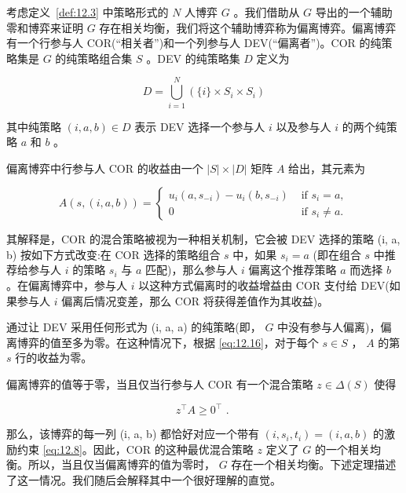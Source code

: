 考虑定义~\ref{def:12.3} 中策略形式的 \(N\) 人博弈 \(G\) 。我们借助从 \(G\) 导出的一个辅助零和博弈来证明 \(G\) 存在相关均衡，我们将这个辅助博弈称为偏离博弈。偏离博弈有一个行参与人 COR(“相关者”)和一个列参与人 DEV(“偏离者”)。COR 的纯策略集是 \(G\) 的纯策略组合集 \(S\) 。DEV 的纯策略集 \(D\) 定义为

\begin{equation}
D = \mathop{\bigcup }\limits_{{i = 1}}^{N}\left( {\{ i\}  \times  {S}_{i} \times  {S}_{i}}\right)  \label{eq:12.15}
\end{equation}

其中纯策略 \(\left( {i,a,b}\right)  \in  D\) 表示 DEV 选择一个参与人 \(i\) 以及参与人 \(i\) 的两个纯策略 \(a\) 和 \(b\) 。

偏离博弈中行参与人 COR 的收益由一个 \(\left| S\right|  \times  \left| D\right|\) 矩阵 \(A\) 给出，其元素为

\begin{equation}
A\left( {s,\left( {i,a,b}\right) }\right)  = \left\{  \begin{array}{ll} {u}_{i}\left( {a,{s}_{-i}}\right)  - {u}_{i}\left( {b,{s}_{-i}}\right) & \text{ if }{s}_{i} = a, \\  0 & \text{ if }{s}_{i} \neq  a. \end{array}\right.  \label{eq:12.16}
\end{equation}

其解释是，COR 的混合策略被视为一种相关机制，它会被 DEV 选择的策略 (i, a, b) 按如下方式改变:在 \(\mathrm{{COR}}\) 选择的策略组合 \(s\) 中，如果 \({s}_{i} = a\) (即在组合 \(s\) 中推荐给参与人 \(i\) 的策略 \({s}_{i}\) 与 \(a\) 匹配)，那么参与人 \(i\) 偏离这个推荐策略 \(a\) 而选择 \(b\) 。在偏离博弈中，参与人 \(i\) 以这种方式偏离时的收益增益由 COR 支付给 DEV(如果参与人 \(i\) 偏离后情况变差，那么 COR 将获得差值作为其收益)。

通过让 DEV 采用任何形式为 (i, a, a) 的纯策略(即， \(G\) 中没有参与人偏离)，偏离博弈的值至多为零。在这种情况下，根据 \eqref{eq:12.16}，对于每个 \(s \in  S\) ， \(A\) 的第 \(s\) 行的收益为零。

偏离博弈的值等于零，当且仅当行参与人 COR 有一个混合策略 \(z \in  \Delta \left( S\right)\) 使得

\begin{equation}
{z}^{\top }A \geq  {0}^{\top }\text{ . } \label{eq:12.17}
\end{equation}

那么，该博弈的每一列 (i, a, b) 都恰好对应一个带有 \(\left( {i,{s}_{i},{t}_{i}}\right)  = \left( {i,a,b}\right)\) 的激励约束 \eqref{eq:12.8}。因此，COR 的这种最优混合策略 \(z\) 定义了 \(G\) 的一个相关均衡。所以，当且仅当偏离博弈的值为零时， \(G\) 存在一个相关均衡。下述定理描述了这一情况。我们随后会解释其中一个很好理解的直觉。



